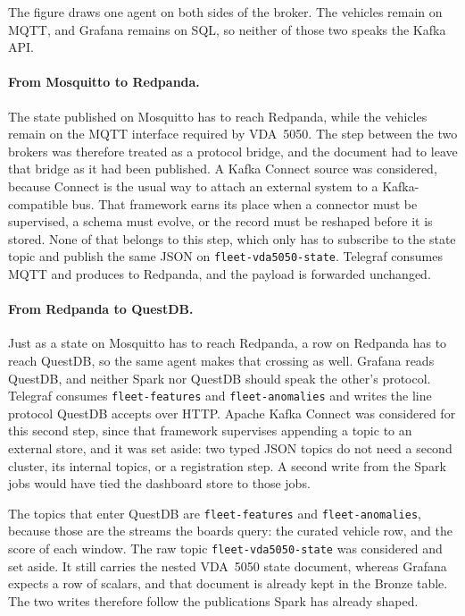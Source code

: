 The figure draws one agent on both sides of the broker. The vehicles remain on MQTT, and Grafana remains on SQL, so neither of those two speaks the Kafka API.

\paragraph{From Mosquitto to Redpanda.}
The state published on Mosquitto has to reach Redpanda, while the vehicles remain on the MQTT interface required by VDA~5050. The step between the two brokers was therefore treated as a protocol bridge, and the document had to leave that bridge as it had been published. A Kafka Connect source was considered, because Connect is the usual way to attach an external system to a Kafka-compatible bus. That framework earns its place when a connector must be supervised, a schema must evolve, or the record must be reshaped before it is stored. None of that belongs to this step, which only has to subscribe to the state topic and publish the same JSON on \texttt{fleet-vda5050-state}. Telegraf consumes MQTT and produces to Redpanda, and the payload is forwarded unchanged.

\paragraph{From Redpanda to QuestDB.}
Just as a state on Mosquitto has to reach Redpanda, a row on Redpanda has to reach QuestDB, so the same agent makes that crossing as well. Grafana reads QuestDB, and neither Spark nor QuestDB should speak the other's protocol. Telegraf consumes \texttt{fleet-features} and \texttt{fleet-anomalies} and writes the line protocol QuestDB accepts over HTTP. Apache Kafka Connect was considered for this second step, since that framework supervises appending a topic to an external store, and it was set aside: two typed JSON topics do not need a second cluster, its internal topics, or a registration step. A second write from the Spark jobs would have tied the dashboard store to those jobs.

The topics that enter QuestDB are \texttt{fleet-features} and \texttt{fleet-anomalies}, because those are the streams the boards query: the curated vehicle row, and the score of each window. The raw topic \texttt{fleet-vda5050-state} was considered and set aside. It still carries the nested VDA~5050 state document, whereas Grafana expects a row of scalars, and that document is already kept in the Bronze table. The two writes therefore follow the publications Spark has already shaped.

